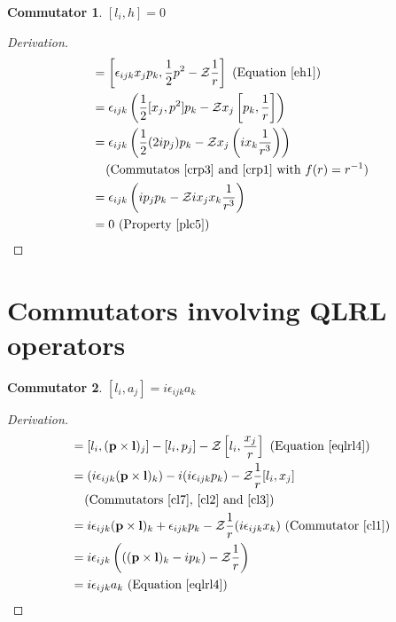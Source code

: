 \documentclass[12pt,a4paper]{report}
\theoremstyle{definition}
\newtheorem{commutator}{Commutator}[section]
\newenvironment{derivation}
  {\renewcommand\qedsymbol{$\square$}\begin{proof}[Derivation]}
  {\end{proof}}
\theoremstyle{remark}
\theoremstyle{remark}
\begin{document}
\begin{appendices}
\begin{commutator}\label{ch8}
$[l_i,h]=0$
\end{commutator}
\begin{derivation}
\begin{align*}
[l_i,h] &= \left[\epsilon_{ijk}x_jp_k,\frac{1}{2}p^2-\mathcal{Z}\frac{1}{r}\right] \text{ (Equation~\ref{eh1})}\\
&= \epsilon_{ijk}\left(\frac{1}{2}[x_j,p^2]p_k-\mathcal{Z}x_j\left[p_k,\frac{1}{r}\right]\right) \\
&= \epsilon_{ijk}\left(\frac{1}{2}(2i p_j)p_k-\mathcal{Z}x_j\left(i x_k\frac{1}{r^3}\right)\right) \\
&\phantom{=} \text{ (Commutatos~\ref{crp3} and~\ref{crp1} with }f(r)=r^{-1}) \\
&= \epsilon_{ijk}\left(ip_jp_k-\mathcal{Z}i x_jx_k\frac{1}{r^3}\right) \\
&= 0 \text{ (Property~\ref{plc5})}
\end{align*}
\end{derivation}

\section{Commutators involving QLRL operators}
\begin{commutator}\label{ca1}
$[l_i,a_j]=i\epsilon_{ijk}a_k$
\end{commutator}
\begin{derivation}
\begin{align*}
[l_i,a_j] &= [l_i,(\textbf{p}\times\textbf{l})_j]-[l_i,p_j]-\mathcal{Z}\left[l_i,\frac{x_j}{r}\right] \text{ (Equation~\ref{eqlrl4})}\\
&= (i\epsilon_{ijk}(\textbf{p}\times\textbf{l})_k)-i(i\epsilon_{ijk}p_k)-\mathcal{Z}\frac{1}{r}[l_i,x_j] \\
&\phantom{=} \text{ (Commutators~\ref{cl7},~\ref{cl2} and~\ref{cl3})} \\
&= i\epsilon_{ijk}(\textbf{p}\times\textbf{l})_k+\epsilon_{ijk}p_k-\mathcal{Z}\frac{1}{r}(i\epsilon_{ijk}x_k) \text{ (Commutator~\ref{cl1})} \\
&= i\epsilon_{ijk}\left(\left((\textbf{p}\times\textbf{l})_k-i p_k\right)-\mathcal{Z}\frac{1}{r}\right) \\
&= i\epsilon_{ijk}a_k \text{ (Equation~\ref{eqlrl4})}
\end{align*}
\end{derivation}


\end{appendices}
\end{document}
